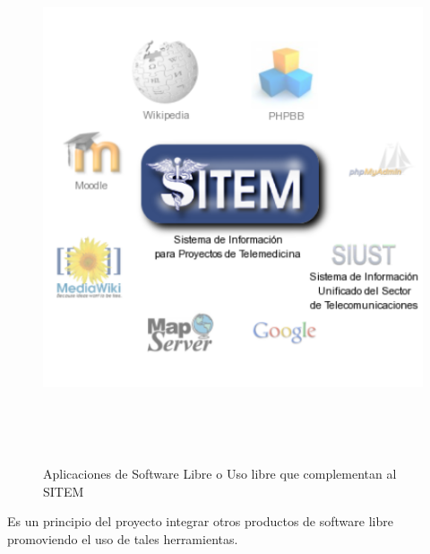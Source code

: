 \begin{figure}
 \centering
 \includegraphics[width=156mm, height=156mm]{sitem_aplicaciones.png}
 \caption{Aplicaciones de Software Libre o Uso libre que complementan al SITEM}
 \label{aplicaciones_sitem}
\end{figure}

Es un principio del proyecto integrar otros productos de software libre promoviendo el uso de tales herramientas.